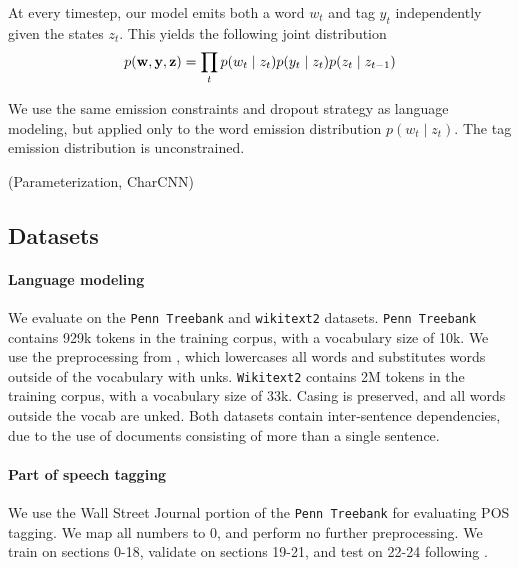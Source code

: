 \documentclass[11pt,a4paper]{article}
\begin{document}
At every timestep, our model emits both a word $w_t$ and tag $y_t$
independently given the states $z_t$.
This yields the following joint distribution
\begin{equation}
\begin{aligned}
p(\mathbf{w}, \mathbf{y}, \mathbf{z})
&= \prod_t p(w_t \mid z_t)p(y_t \mid z_t)p(z_t\mid z_{t-1})\\
\end{aligned}
\end{equation}

We use the same emission constraints and dropout strategy as language modeling,
but applied only to the word emission distribution $p(w_t \mid z_t)$.
The tag emission distribution is unconstrained.

(Parameterization, CharCNN)

\subsection{Datasets}
\paragraph{Language modeling}
We evaluate on the \texttt{Penn Treebank} \citep{ptb}
and \texttt{wikitext2} \citep{wikitext} datasets.
\texttt{Penn Treebank} contains 929k tokens in the training corpus,
with a vocabulary size of 10k.
We use the preprocessing from \citet{mikolov-2011},
which lowercases all words and substitutes words outside of the vocabulary
with unks. 
\texttt{Wikitext2} contains 2M tokens in the training corpus,
with a vocabulary size of 33k.
Casing is preserved, and all words outside the vocab are unked.
Both datasets contain inter-sentence dependencies,
due to the use of documents consisting of more than a single sentence.

\paragraph{Part of speech tagging}
We use the Wall Street Journal portion of the \texttt{Penn Treebank}
for evaluating POS tagging.
We map all numbers to 0, and perform no further preprocessing.
We train on sections 0-18, validate on sections 19-21, and test on 22-24
following \citet{ma2016crf}.
\end{document}
